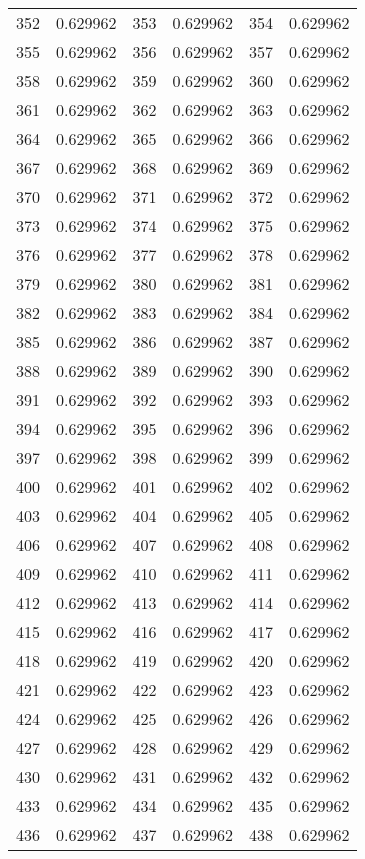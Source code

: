 \documentclass[12pt]{article}
\begin{document}
\begin{longtable}{@{}cc|cc|cc@{}}
352 & 0.629962 & 353 & 0.629962 & 354 & 0.629962 \\
355 & 0.629962 & 356 & 0.629962 & 357 & 0.629962 \\
358 & 0.629962 & 359 & 0.629962 & 360 & 0.629962 \\
361 & 0.629962 & 362 & 0.629962 & 363 & 0.629962 \\
364 & 0.629962 & 365 & 0.629962 & 366 & 0.629962 \\
367 & 0.629962 & 368 & 0.629962 & 369 & 0.629962 \\
370 & 0.629962 & 371 & 0.629962 & 372 & 0.629962 \\
373 & 0.629962 & 374 & 0.629962 & 375 & 0.629962 \\
376 & 0.629962 & 377 & 0.629962 & 378 & 0.629962 \\
379 & 0.629962 & 380 & 0.629962 & 381 & 0.629962 \\
382 & 0.629962 & 383 & 0.629962 & 384 & 0.629962 \\
385 & 0.629962 & 386 & 0.629962 & 387 & 0.629962 \\
388 & 0.629962 & 389 & 0.629962 & 390 & 0.629962 \\
391 & 0.629962 & 392 & 0.629962 & 393 & 0.629962 \\
394 & 0.629962 & 395 & 0.629962 & 396 & 0.629962 \\
397 & 0.629962 & 398 & 0.629962 & 399 & 0.629962 \\
400 & 0.629962 & 401 & 0.629962 & 402 & 0.629962 \\
403 & 0.629962 & 404 & 0.629962 & 405 & 0.629962 \\
406 & 0.629962 & 407 & 0.629962 & 408 & 0.629962 \\
409 & 0.629962 & 410 & 0.629962 & 411 & 0.629962 \\
412 & 0.629962 & 413 & 0.629962 & 414 & 0.629962 \\
415 & 0.629962 & 416 & 0.629962 & 417 & 0.629962 \\
418 & 0.629962 & 419 & 0.629962 & 420 & 0.629962 \\
421 & 0.629962 & 422 & 0.629962 & 423 & 0.629962 \\
424 & 0.629962 & 425 & 0.629962 & 426 & 0.629962 \\
427 & 0.629962 & 428 & 0.629962 & 429 & 0.629962 \\
430 & 0.629962 & 431 & 0.629962 & 432 & 0.629962 \\
433 & 0.629962 & 434 & 0.629962 & 435 & 0.629962 \\
436 & 0.629962 & 437 & 0.629962 & 438 & 0.629962 \\

\end{longtable}
\end{document}
